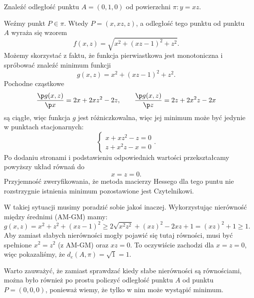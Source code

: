 \begin{example}
    Znaleźć odległość punktu $A = (0, 1, 0)$ od powierzchni $\pi : y = xz$.
\end{example}
\begin{solution}
    Weźmy punkt $P \in \pi$. Wtedy $P = (x, xz, z)$, a odległość tego punktu od punktu $A$ wyraża się wzorem
    \[ f(x, z) = \sqrt{x^2 + (xz- 1)^2 + z^2}. \]
    Możemy skorzystać z faktu, że funkcja pierwiastkowa jest monotoniczna i spróbować znaleźć minimum funkcji
    \[ g(x, z) = x^2 + (xz - 1)^2 + z^2. \]
    Pochodne cząstkowe
    \[ \frac{\p g(x, z)}{\p x} = 2x + 2xz^2 - 2z, \qquad \frac{\p g(x, z)}{\p z} = 2z + 2x^2z - 2x \]
    są ciągłe, więc funkcja $g$ jest różniczkowalna, więc jej minimum może być jedynie w punktach stacjonarnych:
    \[ \begin{cases} x + xz^2 - z = 0 \\ z + x^2z - x = 0 \end{cases}. \]
    Po dodaniu stronami i podstawieniu odpowiednich wartości przekształcamy powyższy układ równań do
    \[ x = z = 0. \]
    Przyjemność zweryfikowania, że metoda macierzy Hessego dla tego puntu nie rozstrzygnie istnienia minimum pozostawione jest Czytelnikowi.

    W takiej sytuacji musimy poradzić sobie jakoś inaczej. Wykorzystując nierówność między średnimi (AM-GM) mamy:
    \[ g(x, z) = x^2 + z^2 + (xz - 1)^2 \geq 2\sqrt{x^2z^2} + (xz)^2 - 2xz + 1 = (xz)^2 + 1 \geq 1. \]
    Aby zamiast słabych nierówności mogły pojawić się tutaj równości, musi być spełnione $x^2 = z^2$ (z AM-GM) oraz $xz = 0$. To oczywiście zachodzi dla $x = z = 0$, więc pokazaliśmy, że $d_e(A, \pi) = \sqrt{1} = 1$.
\end{solution}

Warto zauważyć, że zamiast sprawdzać kiedy słabe nierówności są równościami, można było również po prostu policzyć odległość punktu $A$ od punktu $P = (0, 0, 0)$, ponieważ wiemy, że tylko w nim może wystąpić minimum.